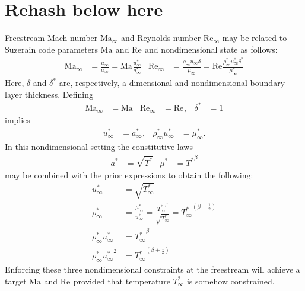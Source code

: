 \documentclass[letterpaper,11pt,nointlimits,reqno]{amsart}
\newcommand{\Mach}[1][]{\mbox{Ma}_{#1}}
\newcommand{\Reynolds}[1][]{\mbox{Re}_{#1}}
\begin{document}
\section{Rehash below here}



Freestream Mach number $\Mach[\infty]$ and Reynolds number $\Reynolds[\infty]$
may be related to Suzerain code parameters $\Mach$ and $\Reynolds$ and
nondimensional state as follows:
\begin{align}
  \Mach[\infty]{}
  &=         \frac{u_\infty     }{a_\infty     }
   = \Mach{} \frac{u_\infty^\ast}{a_\infty^\ast}
&
  \Reynolds[\infty]{}
  &=             \frac{\rho_\infty      u_\infty      \delta     }
                      {\mu_\infty     }
   = \Reynolds{} \frac{\rho_\infty^\ast u_\infty^\ast \delta^\ast}
                      {\mu_\infty^\ast}
\end{align}
Here, $\delta$ and $\delta^\ast$ are, respectively, a dimensional and
nondimensional boundary layer thickness.
Defining
\begin{align}
  \Mach[\infty]{} &= \Mach
& \Reynolds[\infty]{} &= \Reynolds,
& \delta^\ast &= 1
\end{align}
implies
\begin{align}
  u_\infty^\ast   &= a_\infty^\ast,
&
  \rho_\infty^\ast u_\infty^\ast &= \mu_\infty^\ast
.
\end{align}
In this nondimensional setting the constitutive laws
\begin{align}
  a^\ast &= \sqrt{T^\ast}
&\mu^\ast &= {T^\ast}^\beta
\end{align}
may be combined with the prior expressions to obtain the following:
\begin{align}
  \label{eq:u_target}
  u_\infty^\ast &= \sqrt{T_\infty^\ast}
\\
  \label{eq:rho_target}
  \rho_\infty^\ast &= \frac{\mu_\infty^\ast}{u_\infty^\ast}
                    = \frac{{T_\infty^\ast}^\beta}{\sqrt{T_\infty^\ast}}
                    = {T_\infty^\ast}^{\left(\beta-\frac{1}{2}\right)}
\\
  \label{eq:mx_target}
  \rho_\infty^\ast u_\infty^\ast &= {T_\infty^\ast}^\beta
\\
  \label{eq:ke_target}
  \rho_\infty^\ast {u_\infty^\ast}^2
&=
  {T_\infty^\ast}^{\left(\beta + \frac{1}{2}\right)}
\end{align}
Enforcing these three nondimensional constraints at the freestream will achieve
a target $\Mach$ and $\Reynolds$ provided that temperature $T_\infty^\ast$ is
somehow constrained.
\end{document}
